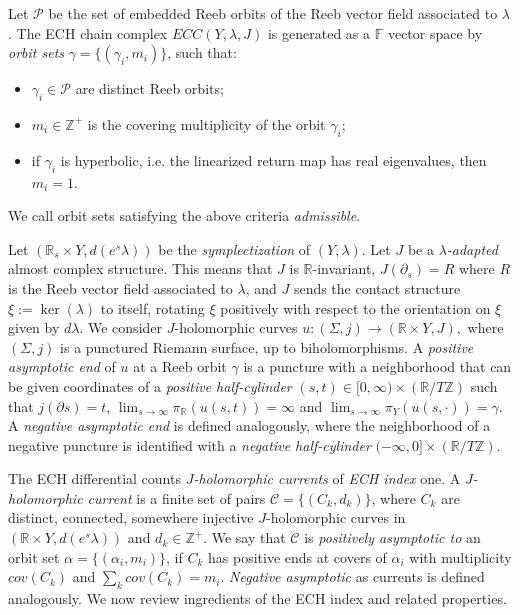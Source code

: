\documentclass{article}
\numberwithin{equation}{section}
\theoremstyle{definition}
\newcommand{\R}{\mathbb{R}}
\newcommand{\Z}{\mathbb{Z}}
\newcommand{\F}{\mathbb{F}}
\begin{document}
Let $\mathcal{P}$ be the set of embedded Reeb orbits of the Reeb vector field associated to $\lambda$. The ECH chain complex $ECC(Y,\lambda, J)$ is generated as a $\F$ vector space by \emph{orbit sets} $\gamma = \{(\gamma_i, m_i)\}$, such that:
\begin{itemize}
\item $\gamma_i \in \mathcal{P}$ are distinct Reeb orbits;
\item $m_i\in \Z^+$ is the covering multiplicity of the orbit $\gamma_i$;
\item if $\gamma_i$ is hyperbolic, i.e. the linearized return map has real eigenvalues, then $m_i = 1$.
\end{itemize}

We call orbit sets satisfying the above criteria \emph{admissible}. 


Let $(\R_s \times Y, d(e^s\lambda))$ be the \emph{symplectization} of $(Y, \lambda)$. Let $J$ be a \emph{$\lambda$-adapted} almost complex structure. This means that $J$ is $\mathbb{R}$-invariant, $J(\partial_s) = R$ where $R$ is the Reeb vector field associated to $\lambda$, and $J$ sends the contact structure $\xi:=\ker(\lambda)$ to itself, rotating $\xi$ positively with respect to the orientation on $\xi$ given by $d\lambda$. We consider $J$-holomorphic curves $u:(\Sigma, j) \to (\R \times Y, J),$ where $(\Sigma, j)$ is a punctured Riemann surface, up to biholomorphisms. A \emph{positive asymptotic end} of $u$ at a Reeb orbit $\gamma$ is a puncture with a neighborhood that can be given coordinates of a \emph{positive half-cylinder} $(s, t)\in [0,\infty) \times (\R/T\Z)$ such that $j(\partial s) = t$, $\lim_{s\to \infty} \pi_\R(u(s, t)) = \infty$ and $\lim_{s \to \infty} \pi_Y(u(s, \cdot)) = \gamma$. A \emph{negative asymptotic end} is defined analogously, where the neighborhood of a negative puncture is identified with a \emph{negative half-cylinder} $(-\infty, 0] \times (\R/T\Z)$.

The ECH differential counts \emph{$J$-holomorphic currents} of \emph{ECH index} one. A \emph{$J$-holomorphic current} is a finite set of pairs $\mathcal{C} = \{(C_k, d_k)\}$, where $C_k$ are distinct, connected, somewhere injective $J$-holomorphic curves in $(\R \times Y, d(e^s\lambda))$ and $d_k\in \Z^+$. We say that $\mathcal{C}$ is \emph{positively asymptotic to} an orbit set $\alpha = \{(\alpha_i, m_i)\}$, if $C_k$ has positive ends at covers of $\alpha_i$ with multiplicity $cov(C_k)$ and $\sum_k cov(C_k) = m_i$. \emph{Negative asymptotic} as currents is defined analogously. We now review ingredients of the ECH index and related properties. 
\end{document}
